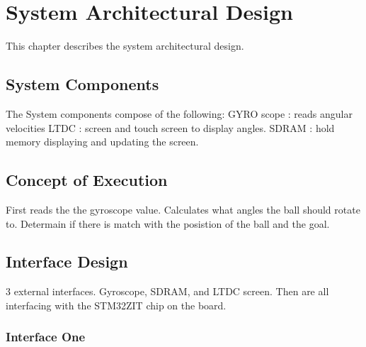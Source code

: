 
\chapter{System Architectural Design}
\label{loc:SystemArchitecturalDesign}


This chapter describes the system architectural design.


\section{System Components}
\label{loc:SystemComponents}


The System components compose of the following:
GYRO scope : reads angular velocities 
LTDC       : screen and touch screen to display angles.
SDRAM      : hold memory displaying and updating the screen.


\section{Concept of Execution}
\label{loc:ConceptOfEExecution}


First reads the the gyroscope value. Calculates what angles the ball should rotate to. Determain if there is match with the posistion of the ball and the goal.


\section{Interface Design}
\label{loc:InterfaceDesign}


3 external interfaces. Gyroscope, SDRAM, and LTDC screen. Then are all interfacing with the STM32ZIT chip on the board.

\subsection{Interface One}
\label{loc:InterfaceOne}
% 

